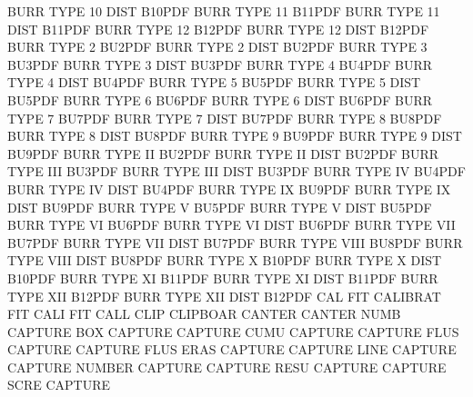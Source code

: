 BURR     TYPE 10   DIST                 B10PDF
BURR     TYPE 11                        B11PDF
BURR     TYPE 11   DIST                 B11PDF
BURR     TYPE 12                        B12PDF
BURR     TYPE 12   DIST                 B12PDF
BURR     TYPE 2                         BU2PDF
BURR     TYPE 2    DIST                 BU2PDF
BURR     TYPE 3                         BU3PDF
BURR     TYPE 3    DIST                 BU3PDF
BURR     TYPE 4                         BU4PDF
BURR     TYPE 4    DIST                 BU4PDF
BURR     TYPE 5                         BU5PDF
BURR     TYPE 5    DIST                 BU5PDF
BURR     TYPE 6                         BU6PDF
BURR     TYPE 6    DIST                 BU6PDF
BURR     TYPE 7                         BU7PDF
BURR     TYPE 7    DIST                 BU7PDF
BURR     TYPE 8                         BU8PDF
BURR     TYPE 8    DIST                 BU8PDF
BURR     TYPE 9                         BU9PDF
BURR     TYPE 9    DIST                 BU9PDF
BURR     TYPE II                        BU2PDF
BURR     TYPE II   DIST                 BU2PDF
BURR     TYPE III                       BU3PDF
BURR     TYPE III  DIST                 BU3PDF
BURR     TYPE IV                        BU4PDF
BURR     TYPE IV   DIST                 BU4PDF
BURR     TYPE IX                        BU9PDF
BURR     TYPE IX   DIST                 BU9PDF
BURR     TYPE V                         BU5PDF
BURR     TYPE V    DIST                 BU5PDF
BURR     TYPE VI                        BU6PDF
BURR     TYPE VI   DIST                 BU6PDF
BURR     TYPE VII                       BU7PDF
BURR     TYPE VII  DIST                 BU7PDF
BURR     TYPE VIII                      BU8PDF
BURR     TYPE VIII DIST                 BU8PDF
BURR     TYPE X                         B10PDF
BURR     TYPE X    DIST                 B10PDF
BURR     TYPE XI                        B11PDF
BURR     TYPE XI   DIST                 B11PDF
BURR     TYPE XII                       B12PDF
BURR     TYPE XII  DIST                 B12PDF
CAL                                     FIT
CALIBRAT                                FIT
CALI                                    FIT
CALL     CLIP                           CLIPBOAR
CANTER                                  CANTER   NUMB
CAPTURE  BOX                            CAPTURE
CAPTURE  CUMU                           CAPTURE
CAPTURE  FLUS                           CAPTURE
CAPTURE  FLUS ERAS                      CAPTURE
CAPTURE  LINE                           CAPTURE
CAPTURE  NUMBER                         CAPTURE
CAPTURE  RESU                           CAPTURE
CAPTURE  SCRE                           CAPTURE
